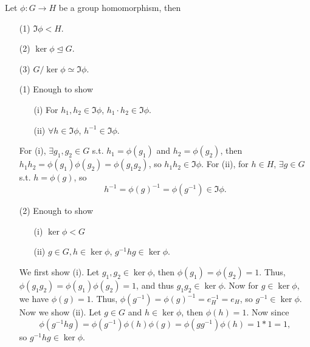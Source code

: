 \begin{eg}
    Let \(\phi : G \to H\) be a group homomorphism, then 
    \begin{itemize}
        \item [(1)] \(\Im \phi < H\). 
        \item [(2)] \(\ker \phi \trianglelefteq G\). 
        \item [(3)] \(G / \ker \phi \simeq \Im \phi \).   
    \end{itemize} 
\end{eg}
\begin{explanation}
    \vphantom{text}
    \begin{itemize}
        \item [(1)] Enough to show 
        \begin{itemize}
            \item [(i)] For \(h_1, h_2 \in \Im \phi \), \(h_1 \cdot h_2 \in \Im \phi \).  
            \item [(ii)] \(\forall h \in \Im \phi \), \(h^{-1} \in \Im \phi  \).   
        \end{itemize}
        For (i), \(\exists g_1, g_2 \in G\) s.t. \(h_1 = \phi \left( g_1 \right) \) and \(h_2 = \phi \left( g_2 \right) \), then \(h_1 h_2 = \phi (g_1) \phi (g_2) = \phi (g_1 g_2)\), so \(h_1 h_2 \in \Im \phi \). For (ii), for \(h \in H\), \(\exists g \in G\) s.t. \(h = \phi (g)\), so 
        \[
            h^{-1} = \phi (g)^{-1} = \phi (g^{-1}) \in \Im \phi .  
        \]       
        \item [(2)] Enough to show 
        \begin{itemize}
            \item [(i)] \(\ker \phi < G\)
            \item [(ii)] \(g \in G, h \in \ker \phi \), \(g^{-1} h g \in \ker \phi  \).   
        \end{itemize}
        We first show (i). Let \(g_1, g_2 \in \ker \phi \), then \(\phi (g_1) = \phi (g_2) = 1\). Thus, \(\phi (g_1 g_2) = \phi (g_1) \phi (g_2) = 1\), and thus \(g_1 g_2 \in \ker \phi \). Now for \(g \in \ker \phi \), we have \(\phi (g) = 1\). Thus, \(\phi \left( g^{-1}  \right) = \phi (g)^{-1} = e_H^{-1} = e_H  \), so \(g^{-1} \in \ker \phi \). Now we show (ii). Let \(g \in G\) and \(h \in \ker \phi \), then \(\phi (h) = 1\). Now since
        \[
            \phi  \left( g^{-1} h g \right) = \phi \left( g^{-1} \right) \phi (h) \phi (g) = \phi \left( g g^{-1} \right) \phi (h) = 1 * 1 = 1,   
        \] so \(g^{-1} h g \in \ker \phi \).

\end{itemize}
\end{explanation}
